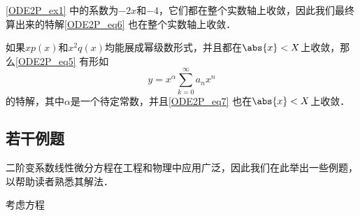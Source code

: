 \autoref{ODE2P_ex1} 中的系数为$-2x$和$-4$，它们都在整个实数轴上收敛，因此我们最终算出来的特解\autoref{ODE2P_eq6} 也在整个实数轴上收敛．

\begin{theorem}{}
如果$xp(x)$和$x^2q(x)$均能展成幂级数形式，并且都在$\abs{x}<X$上收敛，那么\autoref{ODE2P_eq5} 有形如
\begin{equation}\label{ODE2P_eq7}
y=x^\alpha\sum\limits_{k=0}^\infty a_nx^n
\end{equation}
的特解，其中$\alpha$是一个待定常数，并且\autoref{ODE2P_eq7} 也在$\abs{x}<X$上收敛．


\end{theorem}


\subsection{若干例题}

二阶变系数线性微分方程在工程和物理中应用广泛，因此我们在此举出一些例题，以帮助读者熟悉其解法．

\begin{example}{}
考虑方程
\begin{equation}

\end{equation}
\end{example}





